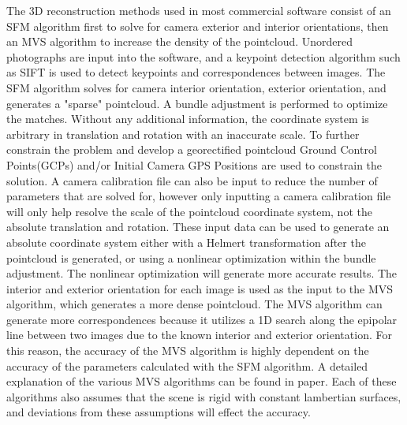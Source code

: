 The 3D reconstruction methods used in most commercial software consist of an SFM algorithm first to solve for camera exterior and interior orientations, then an MVS algorithm to increase the density of the pointcloud.  Unordered photographs are input into the software, and a keypoint detection algorithm such as SIFT is used to detect keypoints and correspondences between images.  The SFM algorithm solves for camera interior orientation, exterior orientation, and generates a "sparse" pointcloud.  A bundle adjustment is performed to optimize the matches.  Without any additional information, the coordinate system is arbitrary in translation and rotation with an inaccurate scale.  To further constrain the problem and develop a georectified pointcloud Ground Control Points(GCPs) and/or Initial Camera GPS Positions are used to constrain the solution.  A camera calibration file can also be input to reduce the number of parameters that are solved for, however only inputting a camera calibration file will only help resolve the scale of the pointcloud coordinate system, not the absolute translation and rotation.  These input data can be used to generate an absolute coordinate system either with a Helmert transformation after the pointcloud is generated,  or using a nonlinear optimization within the bundle adjustment.  The nonlinear optimization will generate more accurate results.  The interior and exterior orientation for each image is used as the input to the MVS algorithm, which generates a more dense pointcloud.  The MVS algorithm can generate more correspondences because it utilizes a 1D search along the epipolar line between two images due to the known interior and exterior orientation.  For this reason, the accuracy of the MVS algorithm is highly dependent on the accuracy of the parameters calculated with the SFM algorithm.  A detailed explanation of the various MVS algorithms can be found in paper.  Each of these algorithms also assumes that the scene is rigid with constant lambertian surfaces, and deviations from these assumptions will effect the accuracy. 


